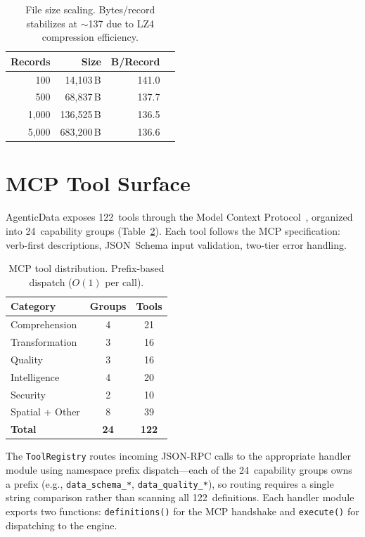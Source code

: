 \documentclass[10pt, twocolumn]{article}
\begin{document}
\begin{table}[t]
\caption{File size scaling. Bytes/record stabilizes at $\sim$137 due to LZ4 compression efficiency.}
\label{tab:filesize}
\centering\scriptsize
\begin{tabular}{@{}rrrr@{}}
\toprule
\textbf{Records} & \textbf{Size} & \textbf{B/Record} \\
\midrule
100 & 14{,}103\,B & 141.0 \\
500 & 68{,}837\,B & 137.7 \\
1{,}000 & 136{,}525\,B & 136.5 \\
5{,}000 & 683{,}200\,B & 136.6 \\
\bottomrule
\end{tabular}
\end{table}


\section{MCP Tool Surface}\label{sec:mcp}

AgenticData exposes 122~tools through the Model Context Protocol~\cite{mcp2024spec}, organized into 24~capability groups (Table~\ref{tab:tools}). Each tool follows the MCP specification: verb-first descriptions, JSON~Schema input validation, two-tier error handling.

\begin{table}[t]
\centering\scriptsize
\begin{tabular}{lcc}
\toprule
\textbf{Category} & \textbf{Groups} & \textbf{Tools} \\
\midrule
Comprehension & 4 & 21 \\
Transformation & 3 & 16 \\
Quality & 3 & 16 \\
Intelligence & 4 & 20 \\
Security & 2 & 10 \\
Spatial + Other & 8 & 39 \\
\midrule
\textbf{Total} & \textbf{24} & \textbf{122} \\
\bottomrule
\end{tabular}
\caption{MCP tool distribution. Prefix-based dispatch ($O(1)$ per call).}
\label{tab:tools}
\end{table}

The \texttt{ToolRegistry} routes incoming JSON-RPC calls to the appropriate handler module using namespace prefix dispatch---each of the 24~capability groups owns a prefix (e.g., \texttt{data\_schema\_*}, \texttt{data\_quality\_*}), so routing requires a single string comparison rather than scanning all 122~definitions. Each handler module exports two functions: \texttt{definitions()} for the MCP handshake and \texttt{execute()} for dispatching to the engine.
\end{document}
